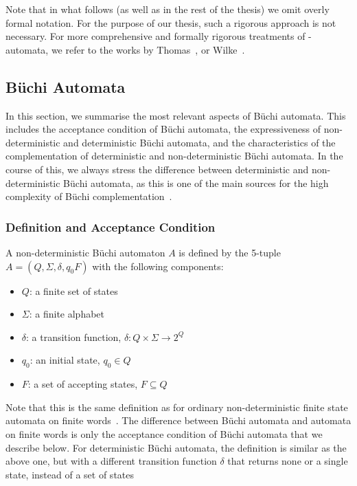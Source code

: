 Note that in what follows (as well as in the rest of the thesis) we omit overly formal notation. For the purpose of our thesis, such a rigorous approach is not necessary. For more comprehensive and formally rigorous treatments of \om-automata, we refer to the works by Thomas~\cite{Thomas:1991,1996_thomas}, or Wilke~\cite{2014_wilke}.

\subsection{Büchi Automata}
\label{2_buchi_automata}
In this section, we summarise the most relevant aspects of Büchi automata. This includes the acceptance condition of Büchi automata, the expressiveness of non-deterministic and deterministic Büchi automata, and the characteristics of the complementation of deterministic and non-deterministic Büchi automata. In the course of this, we always stress the difference between deterministic and non-deterministic Büchi automata, as this is one of the main sources for the high complexity of Büchi complementation~\cite{niessner1997deterministic}.  

\subsubsection{Definition and Acceptance Condition}
A non-deterministic Büchi automaton $A$  is defined by the 5-tuple $A = (Q, \Sigma, \delta, q_0 F)$ with the following components:
\begin{itemize}
\item $Q$: a finite set of states
\item $\Sigma$: a finite alphabet
\item $\delta$: a transition function, $\delta: Q \times \Sigma \rightarrow 2^Q$
\item $q_0$: an initial state, $q_0 \in Q$
\item $F$: a set of accepting states, $F \subseteq Q$
\end{itemize}

Note that this is the same definition as for ordinary non-deterministic finite state automata on finite words~\cite{hopcroft2006automata}. The difference between Büchi automata and automata on finite words is only the acceptance condition of Büchi automata that we describe below. For deterministic Büchi automata, the definition is similar as the above one, but with a different transition function $\delta$ that returns none or a single state, instead of a set of states

